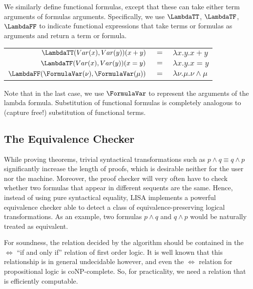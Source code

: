 We similarly define functional formulas, except that these can take either term arguments of formulas arguments. Specifically, we use $\LambdaTT$, $\LambdaTF$, $\LambdaFF$ to indicate functional expressions that take terms or formulas as arguments and return a term or formula.

\begin{ex}
\begin{center}
\begin{tabular}{|r c l|}
\hline
$\LambdaTT(Var(x), Var(y))(x+y)$ & $=$ & $\lambda x.y. x+y$ \\
$\LambdaTF(Var(x), Var(y))(x=y)$ & $=$ & $\lambda x.y. x=y$ \\
$\LambdaFF(\FormulaVar(\nu), \FormulaVar(\mu))$ & $=$ & $\lambda \nu.\mu. \nu \land \mu$ \\
\hline
\end{tabular}
\end{center}

\end{ex}
Note that in the last case, we use $\FormulaVar$ to represent the arguments of the lambda formula. Substitution of functional formulas is completely analogous to (capture free!) substitution of functional terms.



\subsection{The Equivalence Checker}
\label{subs:equivalencechecker}
While proving theorems, trivial syntactical transformations such as $p\land q \equiv q\land p$ significantly increase the length of proofs, which is desirable neither for the user nor the machine. Moreover, the proof checker will very often have to check whether two formulas that appear in different sequents are the same. Hence, instead of using pure syntactical equality, LISA implements a powerful equivalence checker able to detect a class of equivalence-preserving logical transformations. As an example, two formulas $p\land q$ and $q\land p$ would be naturally treated as equivalent.

For soundness, the relation decided by the algorithm should be contained in the $\Longleftrightarrow$ ``if and only if'' relation of first order logic. It is well known that this relationship is in general undecidable however, and even the $\Longleftrightarrow$ relation for propositional logic is coNP-complete. So, for practicality, we need a relation that is efficiently computable.

